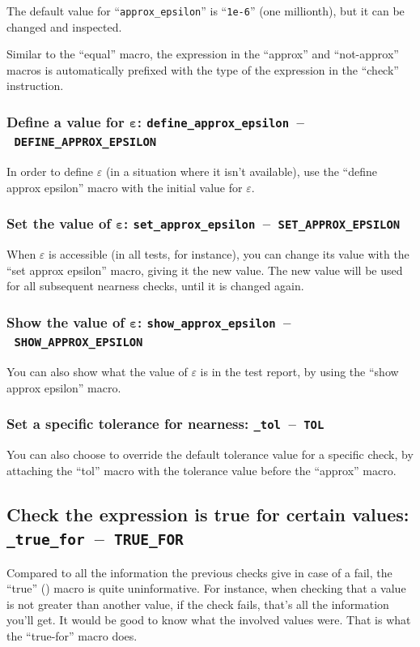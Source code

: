 \documentclass[twoside, a4paper, article]{memoir}
\newcommand*\testudocolor{\color{red!80!blue}}
\newcommand*\testudo[1]{\texttt{\testudocolor{}#1}}
\newcommand*\testudopair[2]{\testudo{#1}~--~\testudo{#2}}
\newcommand\subsectiontestudopair[3]{%
  \subsection[#1]{#1: \testudopair{#2}{#3}}}
\newcommand\subsubsectiontestudopair[3]{%
  \subsubsection[#1]{#1: \testudopair{#2}{#3}}}
\providecommand\typesetexample[1]{%
}
\begin{document}
The default value for ``\texttt{approx\_epsilon}'' is ``\texttt{1e-6}'' (one
millionth), but it can be changed and inspected.

Similar to the ``equal'' macro, the expression in the ``approx'' and
``not-approx'' macros is automatically prefixed with the type of the expression
in the ``check'' instruction.

\subsubsectiontestudopair{Define a value for $\bm{\varepsilon}$}%
  {define\_approx\_epsilon}{DEFINE\_APPROX\_EPSILON}
\label{sec:define-value-epsilon}

In order to define $\varepsilon$ (in a situation where it isn't available), use
the ``define approx epsilon'' macro with the initial value for $\varepsilon$.

\typesetexample{define-approx-epsilon}

\subsubsectiontestudopair{Set the value of $\bm{\varepsilon}$}%
  {set\_approx\_epsilon}{SET\_APPROX\_EPSILON}
\label{sec:set-value-epsilon}

When $\varepsilon$ is accessible (in all tests, for instance), you can change
its value with the ``set approx epsilon'' macro, giving it the new value.  The
new value will be used for all subsequent nearness checks, until it is changed
again.

\typesetexample{set-approx-epsilon}

\subsubsectiontestudopair{Show the value of $\bm{\varepsilon}$}%
  {show\_approx\_epsilon}{SHOW\_APPROX\_EPSILON}
\label{sec:show-value-epsilon}

You can also show what the value of $\varepsilon$ is in the test report, by
using the ``show approx epsilon'' macro.

\typesetexample{show-approx-epsilon}

\subsubsectiontestudopair{Set a specific tolerance for nearness}%
  {\_tol}{TOL}
\label{sec:specify-tolerance-nearness}

You can also choose to override the default tolerance value for a specific
check, by attaching the ``tol'' macro with the tolerance value before the
``approx'' macro.

\typesetexample{check-approx-tol}


\subsectiontestudopair{Check the expression is true for certain values}%
{\_true\_for}{TRUE\_FOR}
\label{sec:check-expression-true-for}

Compared to all the information the previous checks give in case of a fail, the
``true'' () macro is quite uninformative.  For
instance, when checking that a value is not greater than another value, if the
check fails, that's all the information you'll get.  It would be good to know
what the involved values were.  That is what the ``true-for'' macro does.
\end{document}
